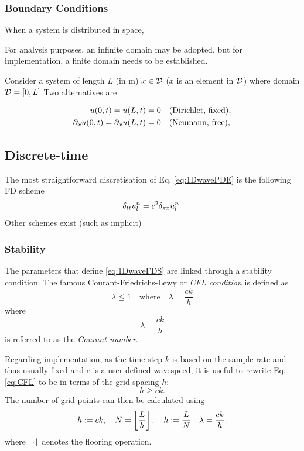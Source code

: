 \subsubsection{Boundary Conditions}
When a system is distributed in space, 

For analysis purposes, an infinite domain may be adopted, but for implementation, a finite domain needs to be established. 

Consider a system of length $L$ (in m) $x\in \mathcal{D}$ ($x$ is an element in $\mathcal{D}$) where domain $\mathcal{D} = [0, L]$
Two alternatives are

\begin{subequations}\label{eq:boundaryCond1DWave}
    \begin{align}
        u(0, t) = u(L, t) &= 0\quad \text{(Dirichlet, fixed)},\label{eq:contDirichlet}\\
        \partial_x u(0, t) = \partial_x u(L, t) &= 0\quad \text{(Neumann, free)},\label{eq:contNeumann}
    \end{align}
\end{subequations}

\subsection{Discrete-time}
The most straightforward discretisation of Eq. \eqref{eq:1DwavePDE} is the following FD scheme
\begin{equation}\label{eq:1DwaveFDS}
    \delta_{tt} u_l^n = c^2 \delta_{xx} u_l^n.
\end{equation}
Other schemes exist (such as implicit)
\subsubsection{Stability}
The parameters that define \eqref{eq:1DwaveFDS} are linked through a stability condition. The famous Courant-Friedrichs-Lewy or \textit{CFL condition} is defined as \cite{courant} 
\begin{equation}\label{eq:CFL}
    \lambda \leq 1 \quad \text{where} \quad \lambda = \frac{ck}{h}
\end{equation}
where
\begin{equation}\label{eq:courantNumber}
    \lambda = \frac{ck}{h}
\end{equation}
is referred to as the \textit{Courant number}.

Regarding implementation, as the time step $k$ is based on the sample rate and thus usually fixed and $c$ is a user-defined wavespeed, it is useful to rewrite Eq. \eqref{eq:CFL} to be in terms of the grid spacing $h$:
\begin{equation}
    h \geq ck.
\end{equation}
The number of grid points can then be calculated using 
\begin{equation}
    h := ck, \quad N = \floor[\frac{L}{h}], \quad h := \frac{L}{N} \quad \lambda = \frac{ck}{h}.
\end{equation}
where $\floor[\cdot]$ denotes the flooring operation. 


